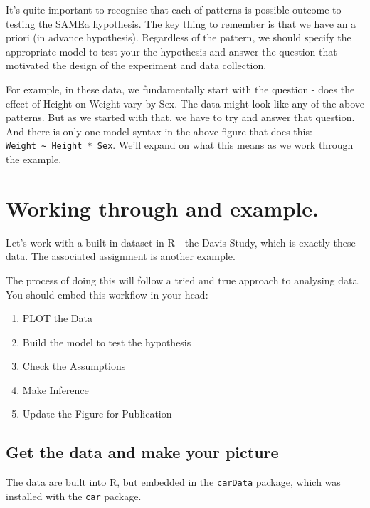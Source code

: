 \documentclass[
]{book}
\providecommand{\tightlist}{%
  \setlength{\itemsep}{0pt}\setlength{\parskip}{0pt}}
\begin{document}
It's quite important to recognise that each of patterns is possible outcome to testing the SAMEa hypothesis. The key thing to remember is that we have an a priori (in advance hypothesis). Regardless of the pattern, we should specify the appropriate model to test your the hypothesis and answer the question that motivated the design of the experiment and data collection.

For example, in these data, we fundamentally start with the question - does the effect of Height on Weight vary by Sex. The data might look like any of the above patterns. But as we started with that, we have to try and answer that question. And there is only one model syntax in the above figure that does this: \texttt{Weight\ \textasciitilde{}\ Height\ *\ Sex}. We'll expand on what this means as we work through the example.

\hypertarget{working-through-and-example.}{%
\section{Working through and example.}\label{working-through-and-example.}}

Let's work with a built in dataset in R - the Davis Study, which is exactly these data. The associated assignment is another example.

The process of doing this will follow a tried and true approach to analysing data. You should embed this workflow in your head:

\begin{enumerate}
\def\labelenumi{\arabic{enumi})}
\tightlist
\item
  PLOT the Data
\item
  Build the model to test the hypothesis
\item
  Check the Assumptions
\item
  Make Inference
\item
  Update the Figure for Publication
\end{enumerate}

\hypertarget{get-the-data-and-make-your-picture}{%
\subsection{Get the data and make your picture}\label{get-the-data-and-make-your-picture}}

The data are built into R, but embedded in the \texttt{carData} package, which was installed with the \texttt{car} package.
\end{document}
